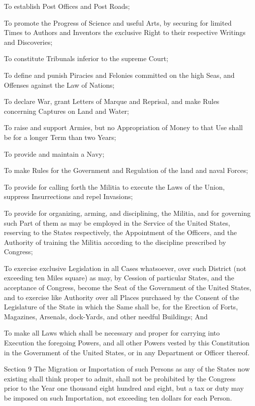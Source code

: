 \documentclass[12pt,a4paper]{article}
\begin{document}
To establish Post Offices and Post Roads;

To promote the Progress of Science and useful Arts, by securing for limited
Times to Authors and Inventors the exclusive Right to their respective Writings
and Discoveries;

To constitute Tribunals inferior to the supreme Court;

To define and punish Piracies and Felonies committed on the high Seas, and
Offenses against the Law of Nations;

To declare War, grant Letters of Marque and Reprisal, and make Rules concerning
Captures on Land and Water;

To raise and support Armies, but no Appropriation of Money to that Use shall be
for a longer Term than two Years;

To provide and maintain a Navy;

To make Rules for the Government and Regulation of the land and naval Forces;

To provide for calling forth the Militia to execute the Laws of the Union,
suppress Insurrections and repel Invasions;

To provide for organizing, arming, and disciplining, the Militia, and for
governing such Part of them as may be employed in the Service of the United
States, reserving to the States respectively, the Appointment of the Officers,
and the Authority of training the Militia according to the discipline
prescribed by Congress;

To exercise exclusive Legislation in all Cases whatsoever, over such District
(not exceeding ten Miles square) as may, by Cession of particular States, and
the acceptance of Congress, become the Seat of the Government of the United
States, and to exercise like Authority over all Places purchased by the Consent
of the Legislature of the State in which the Same shall be, for the Erection of
Forts, Magazines, Arsenals, dock-Yards, and other needful Buildings; And

To make all Laws which shall be necessary and proper for carrying into
Execution the foregoing Powers, and all other Powers vested by this
Constitution in the Government of the United States, or in any Department or
Officer thereof.

Section 9
The Migration or Importation of such Persons as any of the States now existing
shall think proper to admit, shall not be prohibited by the Congress prior to
the Year one thousand eight hundred and eight, but a tax or duty may be imposed
on such Importation, not exceeding ten dollars for each Person.
\end{document}
